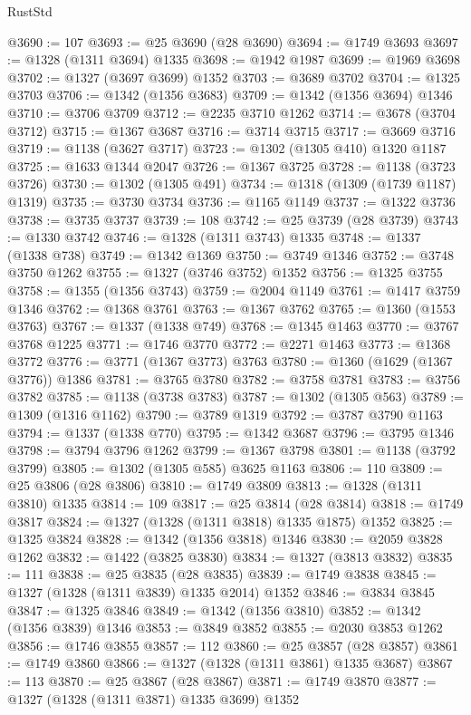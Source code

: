 \begin{lexlean}{RustStd}
\begin{coremodule}
@3690 := 107
@3693 := @25 @3690 (@28 @3690)
@3694 := @1749 @3693
@3697 := @1328 (@1311 @3694) @1335
@3698 := @1942 @1987
@3699 := @1969 @3698
@3702 := @1327 (@3697 @3699) @1352
@3703 := @3689 @3702
@3704 := @1325 @3703
@3706 := @1342 (@1356 @3683)
@3709 := @1342 (@1356 @3694) @1346
@3710 := @3706 @3709
@3712 := @2235 @3710 @1262
@3714 := @3678 (@3704 @3712)
@3715 := @1367 @3687
@3716 := @3714 @3715
@3717 := @3669 @3716
@3719 := @1138 (@3627 @3717)
@3723 := @1302 (@1305 @410) @1320 @1187
@3725 := @1633 @1344 @2047
@3726 := @1367 @3725
@3728 := @1138 (@3723 @3726)
@3730 := @1302 (@1305 @491)
@3734 := @1318 (@1309 (@1739 @1187) @1319)
@3735 := @3730 @3734
@3736 := @1165 @1149
@3737 := @1322 @3736
@3738 := @3735 @3737
@3739 := 108
@3742 := @25 @3739 (@28 @3739)
@3743 := @1330 @3742
@3746 := @1328 (@1311 @3743) @1335
@3748 := @1337 (@1338 @738)
@3749 := @1342 @1369
@3750 := @3749 @1346
@3752 := @3748 @3750 @1262
@3755 := @1327 (@3746 @3752) @1352
@3756 := @1325 @3755
@3758 := @1355 (@1356 @3743)
@3759 := @2004 @1149
@3761 := @1417 @3759 @1346
@3762 := @1368 @3761
@3763 := @1367 @3762
@3765 := @1360 (@1553 @3763)
@3767 := @1337 (@1338 @749)
@3768 := @1345 @1463
@3770 := @3767 @3768 @1225
@3771 := @1746 @3770
@3772 := @2271 @1463
@3773 := @1368 @3772
@3776 := @3771 (@1367 @3773) @3763
@3780 := @1360 (@1629 (@1367 @3776)) @1386
@3781 := @3765 @3780
@3782 := @3758 @3781
@3783 := @3756 @3782
@3785 := @1138 (@3738 @3783)
@3787 := @1302 (@1305 @563)
@3789 := @1309 (@1316 @1162)
@3790 := @3789 @1319
@3792 := @3787 @3790 @1163
@3794 := @1337 (@1338 @770)
@3795 := @1342 @3687
@3796 := @3795 @1346
@3798 := @3794 @3796 @1262
@3799 := @1367 @3798
@3801 := @1138 (@3792 @3799)
@3805 := @1302 (@1305 @585) @3625 @1163
@3806 := 110
@3809 := @25 @3806 (@28 @3806)
@3810 := @1749 @3809
@3813 := @1328 (@1311 @3810) @1335
@3814 := 109
@3817 := @25 @3814 (@28 @3814)
@3818 := @1749 @3817
@3824 := @1327 (@1328 (@1311 @3818) @1335 @1875) @1352
@3825 := @1325 @3824
@3828 := @1342 (@1356 @3818) @1346
@3830 := @2059 @3828 @1262
@3832 := @1422 (@3825 @3830)
@3834 := @1327 (@3813 @3832)
@3835 := 111
@3838 := @25 @3835 (@28 @3835)
@3839 := @1749 @3838
@3845 := @1327 (@1328 (@1311 @3839) @1335 @2014) @1352
@3846 := @3834 @3845
@3847 := @1325 @3846
@3849 := @1342 (@1356 @3810)
@3852 := @1342 (@1356 @3839) @1346
@3853 := @3849 @3852
@3855 := @2030 @3853 @1262
@3856 := @1746 @3855
@3857 := 112
@3860 := @25 @3857 (@28 @3857)
@3861 := @1749 @3860
@3866 := @1327 (@1328 (@1311 @3861) @1335 @3687)
@3867 := 113
@3870 := @25 @3867 (@28 @3867)
@3871 := @1749 @3870
@3877 := @1327 (@1328 (@1311 @3871) @1335 @3699) @1352

\end{coremodule}
\end{lexlean}
